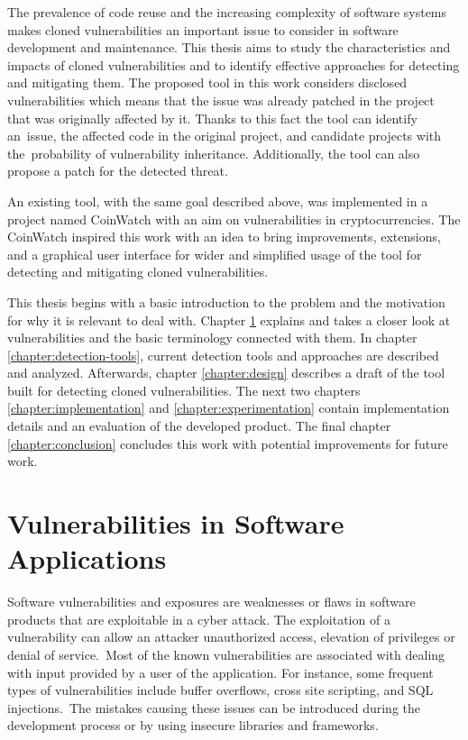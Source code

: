   The prevalence of code reuse and the increasing complexity of software systems makes cloned vulnerabilities
  an important issue to consider in software development and maintenance. This thesis aims to study the
  characteristics and impacts of cloned vulnerabilities and to identify effective approaches for detecting
  and mitigating them. The proposed tool in this work considers disclosed vulnerabilities which means
  that the issue was already patched in the project that was originally affected by it. Thanks to this fact
  the tool can identify an~issue, the affected code in the original project, and candidate projects with
  the~probability of vulnerability inheritance. Additionally, the tool can also propose a patch for
  the detected threat.

  An existing tool, with the same goal described above, was implemented in a project named CoinWatch
  \cite{CoinWatch} with an aim on vulnerabilities in cryptocurrencies. The CoinWatch inspired this work
  with an idea to bring improvements, extensions, and a graphical user interface for wider and simplified
  usage of the tool for detecting and mitigating cloned vulnerabilities.

  This thesis begins with a basic introduction to the problem and the motivation for why it is relevant
  to deal with. Chapter \ref{chapter:vulnerabilities} explains and takes a closer look at vulnerabilities
  and the basic terminology connected with them. In chapter \ref{chapter:detection-tools}, current detection
  tools and approaches are described and analyzed. Afterwards, chapter \ref{chapter:design} describes
  a draft of the tool built for detecting cloned vulnerabilities. The next two chapters
  \ref{chapter:implementation} and \ref{chapter:experimentation} contain implementation details
  and an evaluation of the developed product. The final chapter \ref{chapter:conclusion} concludes this work
  with potential improvements for future work.


\chapter{Vulnerabilities in Software Applications}
\label{chapter:vulnerabilities}
  Software vulnerabilities and exposures are weaknesses or flaws in software products that are
  exploitable in a cyber attack. The exploitation of a vulnerability can allow an attacker unauthorized
  access, elevation of privileges or denial of service.\,\cite{SoftwareVulnerabilities}
  Most of the known vulnerabilities are associated with dealing with input provided by a user
  of the application. For instance, some frequent types of vulnerabilities include buffer overflows,
  cross site scripting, and SQL injections.\,\cite{vulnerabilities} The mistakes causing these issues
  can be introduced during the development process or by using insecure libraries and frameworks.

